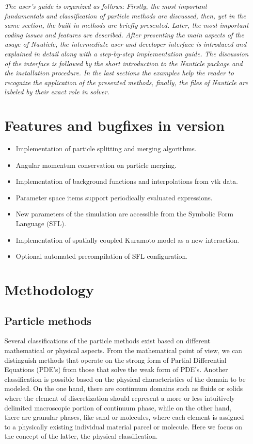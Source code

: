 \documentclass[a4paper,12pt,openany]{book}
\theoremstyle{break}
\begin{document}
\textit{The user's guide is organized as follows: Firstly, the most important fundamentals and classification of particle methods are discussed, then, yet in the same section, the built-in methods are briefly presented. Later, the most important coding issues and features are described. After presenting the main aspects of the usage of Nauticle, the intermediate user and developer interface is introduced and explained in detail along with a step-by-step implementation guide. The discussion of the interface is followed by the short introduction to the Nauticle package and the installation procedure. In the last sections the examples help the reader to recognize the application of the presented methods, finally, the files of Nauticle are labeled by their exact role in solver.}

\section{Features and bugfixes in version \nauticleversion}
\begin{itemize}
  \item Implementation of particle splitting and merging algorithms.
  \item Angular momentum conservation on particle merging.
  \item Implementation of background functions and interpolations from vtk data.
  \item Parameter space items support periodically evaluated expressions.
  \item New parameters of the simulation are accessible from the Symbolic Form Language (SFL).
  \item Implementation of spatially coupled Kuramoto model as a new interaction.
  \item Optional automated precompilation of SFL configuration.
\end{itemize}

\section{Methodology}
\subsection{Particle methods} \label{sec:particle_method_classification}
Several classifications of the particle methods exist based on different mathematical or physical aspects. From the mathematical point of view, we can distinguish methods that operate on the strong form of Partial Differential Equations (PDE's) from those that solve the weak form of PDE's. Another classification is possible based on the physical characteristics of the domain to be modeled. On the one hand, there are continuum domains such as fluids or solids where the element of discretization should represent a more or less intuitively delimited macroscopic portion of continuum phase, while on the other hand, there are granular phases, like sand or molecules, where each element is assigned to a physically existing individual material parcel or molecule. Here we focus on the concept of the latter, the physical classification.
\end{document}

